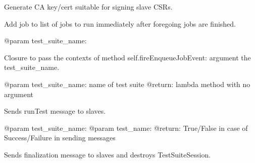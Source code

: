\documentclass[letterpaper,10pt,english]{sphinxmanual}
\begin{document}
\begin{fulllineitems}
\begin{fulllineitems}
\label{ref-manual/XrdTestMaster:XrdTestMaster.XrdTestMaster.createCA}
Generate CA key/cert suitable for signing slave CSRs.

\end{fulllineitems}


\begin{fulllineitems}
\label{ref-manual/XrdTestMaster:XrdTestMaster.XrdTestMaster.enqueueJob}
Add job to list of jobs to run immediately after foregoing
jobs are finished.

@param test\_suite\_name:

\end{fulllineitems}


\begin{fulllineitems}
\label{ref-manual/XrdTestMaster:XrdTestMaster.XrdTestMaster.executeJob}
Closure to pass the contexts of method self.fireEnqueueJobEvent:
argument the test\_suite\_name.

@param test\_suite\_name: name of test suite
@return: lambda method with no argument

\end{fulllineitems}


\begin{fulllineitems}
\label{ref-manual/XrdTestMaster:XrdTestMaster.XrdTestMaster.finalizeTestCase}
Sends runTest message to slaves.

@param test\_suite\_name:
@param test\_name:
@return: True/False in case of Success/Failure in sending messages

\end{fulllineitems}


\begin{fulllineitems}
\label{ref-manual/XrdTestMaster:XrdTestMaster.XrdTestMaster.finalizeTestSuite}
Sends finalization message to slaves and destroys TestSuiteSession.


\end{fulllineitems}
\end{fulllineitems}
\end{document}
